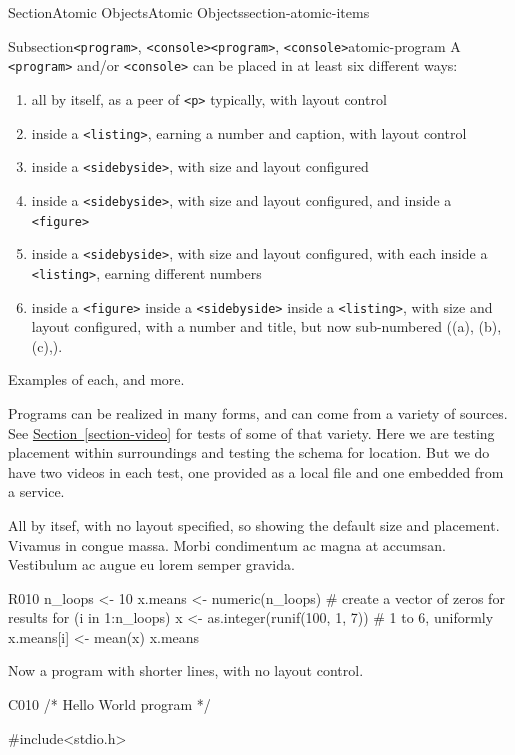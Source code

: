 \documentclass[twoside,10pt,]{article}
\newcommand{\xreffont}{\relax}
\newcommand{\mono}[1]{\texttt{#1}}
\numberwithin{equation}{section}
\begin{document}
\begin{sectionptx}{Section}{Atomic Objects}{}{Atomic Objects}{}{}{section-atomic-items}
\begin{subsectionptx}{Subsection}{\mono{<program>}, \mono{<console>}}{}{\mono{<program>}, \mono{<console>}}{}{}{atomic-program}
A \mono{<program>} and\slash{}or \mono{<console>} can be placed in at least six  different ways:%
\begin{enumerate}
\item{}all by itself, as a peer of \mono{<p>} typically, with layout control%
\item{}inside a \mono{<listing>}, earning a number and caption, with layout control%
\item{}inside a \mono{<sidebyside>}, with size and layout configured%
\item{}inside a \mono{<sidebyside>}, with size and layout configured, and inside a \mono{<figure>}%
\item{}inside a \mono{<sidebyside>}, with size and layout configured, with each inside a \mono{<listing>}, earning different numbers%
\item{}inside a \mono{<figure>} inside a \mono{<sidebyside>} inside a \mono{<listing>}, with size and layout configured, with a number and title, but now sub-numbered ((a), (b), (c),\textellipsis{}).%
\end{enumerate}
Examples of each, and more.%
\par
Programs can be realized in many forms, and can come from a variety of sources.  See \hyperref[section-video]{Section~{\xreffont\ref{section-video}}} for tests of some of that variety.  Here we are testing placement within surroundings and testing the schema for location.  But we do have two videos in each test, one provided as a local file and one embedded from a service.%
\par
All by itsef, with no layout specified, so showing the default size and placement.  Vivamus in congue massa. Morbi condimentum ac magna at accumsan. Vestibulum ac augue eu lorem semper gravida.%
\begin{program}{R}{0}{1}{0}
n_loops <- 10
x.means <- numeric(n_loops)  # create a vector of zeros for results
for (i in 1:n_loops){
    x <- as.integer(runif(100, 1, 7))  # 1 to 6, uniformly
    x.means[i] <- mean(x)
}
x.means
\end{program}
Now a program with shorter lines, with no layout control.%
\begin{program}{C}{0}{1}{0}
/* Hello World program */

#include<stdio.h>


\end{program}
\end{subsectionptx}
\end{sectionptx}
\end{document}
